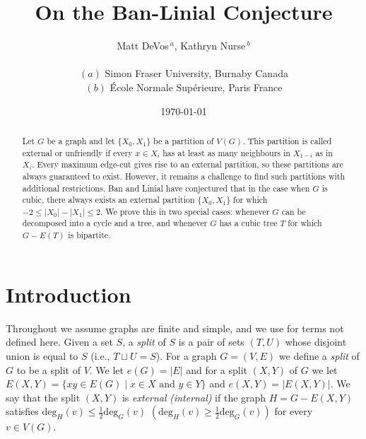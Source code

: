 \documentclass[12pt]{article}
\begin{document}
\setcounter{page}{1} \setcounter{section}{0}
\newtheorem{theorem}{Theorem}[section]
\newtheorem{lemma}[theorem]{Lemma}
\newtheorem{corollary}[theorem]{Corollary}
\newtheorem{proposition}[theorem]{Proposition}
\newtheorem{observation}[theorem]{Observation}
\newtheorem{definition}[theorem]{Definition}
\newtheorem{claim}{Claim}
\newtheorem{conjecture}[theorem]{Conjecture}
\newtheorem{problem}[theorem]{Problem}


\title{On the Ban-Linial Conjecture}
\author{
{\sc Matt DeVos}$\,^{a}$, {\sc Kathryn Nurse}$\,^{b}$\\
\mbox{}\\
{\small $(a)$ Simon Fraser University, Burnaby Canada}\\
{\small $(b)$ \'Ecole Normale Sup\'erieure, Paris France}
}
%

\date{\today}

\maketitle

\begin{abstract}
Let $G$ be a graph and let $\{X_0,X_1\}$ be a partition of $V(G)$.  This partition is called external or unfriendly if every $x \in X_i$ has at least as many neighbours in $X_{1-i}$ as in $X_i$.  Every maximum edge-cut gives rise to an external partition, so these partitions are always guaranteed to exist.  However, it remains a challenge to find such partitions with additional restrictions.  Ban and Linial have conjectured that in the case when $G$ is cubic, there always exists an external partition $\{X_0,X_1\}$ for which $-2 \le |X_0| - |X_1| \le 2$.  We prove this in two special cases: whenever $G$ can be decomposed into a cycle and a tree, and whenever $G$ has a cubic tree $T$ for which $G - E(T)$ is bipartite.
\end{abstract}



\section{Introduction}

Throughout we assume graphs are finite and simple, and we use \cite{BondyJ.A.JohnAdrian2008Gt/J} for terms not defined here. Given a set $S$, a \emph{split} of $S$ is a pair of sets $(T,U)$ whose disjoint union is equal to $S$ (i.e., $T \sqcup U = S$). For a graph $G = (V,E)$ we define a \emph{split} of $G$ to be a split of $V$.  We let $e(G) = |E|$ and for a split $(X,Y)$ of $G$ we let $E(X,Y) = 
\{ xy \in E(G) \mid \mbox{$x \in X$ and $y \in Y$} \}$ and $e(X,Y) = |E(X,Y)|$.  We say that the split $(X,Y)$ is \emph{external} \emph{(internal)} if the graph $H = G - E(X,Y)$ satisfies $\mathrm{deg}_H(v) \le \frac{1}{2} \mathrm{deg}_G(v)$ $(\mathrm{deg}_H(v) \ge \frac{1}{2} \mathrm{deg}_G(v))$ for every $v \in V(G)$.  
\end{document}
